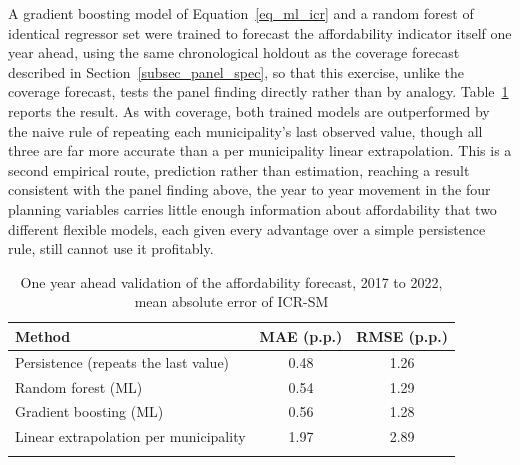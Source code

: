 \documentclass[pdflatex,sn-mathphys-num]{sn-jnl}%
\theoremstyle{thmstyleone}%
\theoremstyle{thmstyletwo}%
\theoremstyle{thmstylethree}%
\begin{document}
A gradient boosting model of Equation~\eqref{eq_ml_icr} and a random forest of identical regressor set were trained to forecast the affordability indicator itself one year ahead, using the same chronological holdout as the coverage forecast described in Section~\ref{subsec_panel_spec}, so that this exercise, unlike the coverage forecast, tests the panel finding directly rather than by analogy. Table~\ref{tab_validacao_ml_icr} reports the result. As with coverage, both trained models are outperformed by the naive rule of repeating each municipality's last observed value, though all three are far more accurate than a per municipality linear extrapolation. This is a second empirical route, prediction rather than estimation, reaching a result consistent with the panel finding above, the year to year movement in the four planning variables carries little enough information about affordability that two different flexible models, each given every advantage over a simple persistence rule, still cannot use it profitably.

\begin{table}[h]
\caption{One year ahead validation of the affordability forecast, 2017 to 2022, mean absolute error of ICR-SM}\label{tab_validacao_ml_icr}
\begin{tabular}{@{}lcc@{}}
\toprule
Method & MAE (p.p.) & RMSE (p.p.) \\
\midrule
Persistence (repeats the last value)  & 0.48 & 1.26 \\
Random forest (ML)                    & 0.54 & 1.29 \\
Gradient boosting (ML)                & 0.56 & 1.28 \\
Linear extrapolation per municipality & 1.97 & 2.89 \\
\botrule
\end{tabular}
\end{table}
\end{document}
